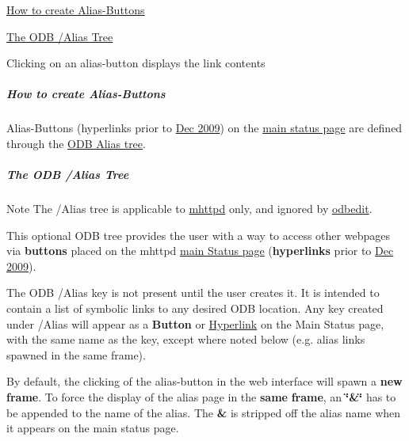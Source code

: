 \begin{DoxyItemize}
\item \hyperlink{RC_mhttpd_Alias_page_RC_mhttpd_alias_define}{How to create Alias-\/Buttons}
\item \hyperlink{RC_mhttpd_Alias_page_RC_odb_alias_tree}{The ODB /Alias Tree}
\end{DoxyItemize}

\label{RC_mhttpd_Alias_page_mhttpd_alias_image}
\hypertarget{RC_mhttpd_Alias_page_mhttpd_alias_image}{}
 \par
\par
\par
 \begin{center} Clicking on an alias-\/button displays the link contents   \end{center}  \par
\par
\par
 \par


\par
\hypertarget{RC_mhttpd_Alias_page_RC_mhttpd_alias_define}{}\subparagraph{How to create Alias-\/Buttons}\label{RC_mhttpd_Alias_page_RC_mhttpd_alias_define}
Alias-\/Buttons (hyperlinks prior to \hyperlink{NDF_ndf_dec_2009}{Dec 2009}) on the \hyperlink{RC_mhttpd_status_page_features_RC_mhpptd_optional_buttons}{main status page} are defined through the \hyperlink{RC_mhttpd_Alias_page_RC_odb_alias_tree}{ODB Alias tree}. \par


\label{RC_mhttpd_Alias_page_idx_ODB_tree_Alias}
\hypertarget{RC_mhttpd_Alias_page_idx_ODB_tree_Alias}{}
 \hypertarget{RC_mhttpd_Alias_page_RC_odb_alias_tree}{}\subparagraph{The ODB /Alias Tree}\label{RC_mhttpd_Alias_page_RC_odb_alias_tree}
\begin{DoxyNote}{Note}
The  /Alias  tree is applicable to \hyperlink{RC_mhttpd}{mhttpd} only, and ignored by \hyperlink{RC_odbedit}{odbedit}.
\end{DoxyNote}
This optional ODB tree provides the user with a way to access other webpages via {\bfseries buttons} placed on the mhttpd \hyperlink{RC_mhttpd_status_page_redesign}{main Status page} ({\bfseries hyperlinks} prior to \hyperlink{NDF_ndf_dec_2009}{Dec 2009}).

\par


The ODB /Alias key is not present until the user creates it. It is intended to contain a list of symbolic links to any desired ODB location. Any key created under /Alias will appear as a {\bfseries Button} or \hyperlink{RC_mhttpd_status_page_redesign}{Hyperlink} on the Main Status page, with the same name as the key, except where noted below (e.g. alias links spawned in the same frame). \par
 \par
 By default, the clicking of the alias-\/button in the web interface will spawn a {\bfseries new} {\bfseries frame}. To force the display of the alias page in the {\bfseries same} {\bfseries frame}, an {\bfseries \char`\"{}\&\char`\"{}} has to be appended to the name of the alias. The {\bfseries \&} is stripped off the alias name when it appears on the main status page.

